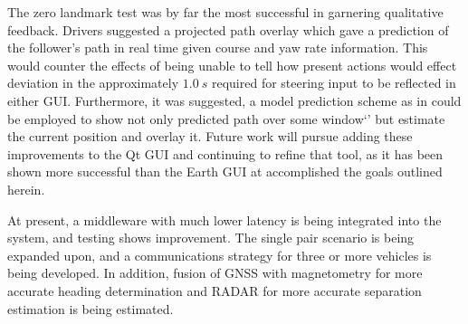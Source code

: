 \documentclass[twocolumn,10pt]{article}
\begin{document}
  The zero landmark test was by far the most successful in garnering qualitative feedback.  Drivers suggested a projected path overlay which gave a prediction of the follower's path in real time given course and yaw rate information.  This would counter the effects of being unable to tell how present actions would effect deviation in the approximately $1.0~s$ required for steering input to be reflected in either GUI.  Furthermore, it was suggested, a model prediction scheme as in \cite{williamthesis} could be employed to show not only predicted path over some window`' but estimate the current position and overlay it.  Future work will pursue adding these improvements to the Qt GUI and continuing to refine that tool, as it has been shown more successful than the Earth GUI at accomplished the goals outlined herein.

  At present, a middleware with much lower latency is being integrated into the system, and testing shows improvement.  The single pair scenario is being expanded upon, and a communications strategy for three or more vehicles is being developed.  In addition, fusion of GNSS with magnetometry for more accurate heading determination and RADAR for more accurate separation estimation is being estimated.



\nocite{CofieldUGThesis}

\end{document}
